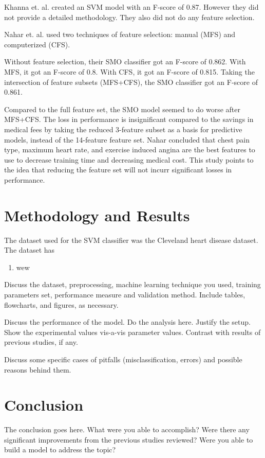 \documentclass[conference]{IEEEtran}
\begin{document}
	Khanna et. al. \cite{bib:mltech} created an SVM model with an F-score of 0.87.
	However they did not provide a detailed methodology.
	They also did not do any feature selection.

	Nahar et. al. \cite{bib:smo} used two techniques of feature selection: 
	manual (MFS) and computerized (CFS).

	Without feature selection, their SMO classifier got an F-score of 0.862.
	With MFS, it got an F-score of 0.8.
	With CFS, it got an F-score of 0.815.
	Taking the intersection of feature subsets (MFS+CFS), the SMO classifier got an F-score of 0.861.

	Compared to the full feature set, the SMO model seemed to do worse after MFS+CFS.
	The loss in performance is insignificant compared to the savings in medical fees by taking the reduced 3-feature subset as a basis for predictive models, instead of the 14-feature feature set.
	Nahar concluded that chest pain type, maximum heart rate, and exercise induced angina are the best features to use to decrease training time and decreasing medical cost.
	This study points to the idea that reducing the feature set will not incurr significant losses in performance.

\section{Methodology and Results}
	The dataset used for the SVM classifier was the Cleveland heart disease dataset.
	The dataset has 
	\begin{enumerate}
		\item wew
	\end{enumerate}
Discuss the dataset, preprocessing, machine learning technique you used, training parameters set, performance measure and validation method.
Include tables, flowcharts, and figures, as necessary.

Discuss the performance of the model. Do the analysis here. Justify the setup. Show the experimental values vis-a-vis parameter values. Contrast with results of previous studies, if any. 

Discuss some specific cases of pitfalls (misclassification, errors) and possible reasons behind them.
\section{Conclusion}
The conclusion goes here. What were you able to accomplish? Were there any significant improvements from the previous studies reviewed? Were you able to build a model to address the topic?
\end{document}

